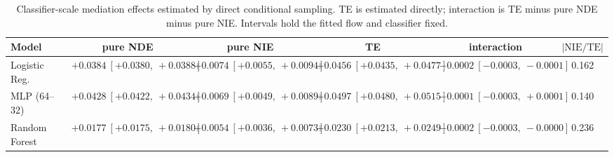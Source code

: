\begin{table}[htbp]
  \centering
  \caption{Classifier-scale mediation effects estimated by direct conditional sampling. TE is estimated directly; interaction is TE minus pure NDE minus pure NIE. Intervals hold the fitted flow and classifier fixed.}
  \label{tab:german_synth_m0_gap_overall}
  \begin{tabular}{lccccc}
    \toprule
    Model & pure NDE & pure NIE & TE & interaction & $|\mathrm{NIE}/\mathrm{TE}|$ \\
    \midrule
    Logistic Reg. & $+0.0384\ [+0.0380,\ +0.0388]$ & $+0.0074\ [+0.0055,\ +0.0094]$ & $+0.0456\ [+0.0435,\ +0.0477]$ & $-0.0002\ [-0.0003,\ -0.0001]$ & 0.162 \\
    MLP (64--32) & $+0.0428\ [+0.0422,\ +0.0434]$ & $+0.0069\ [+0.0049,\ +0.0089]$ & $+0.0497\ [+0.0480,\ +0.0515]$ & $-0.0001\ [-0.0003,\ +0.0001]$ & 0.140 \\
    Random Forest & $+0.0177\ [+0.0175,\ +0.0180]$ & $+0.0054\ [+0.0036,\ +0.0073]$ & $+0.0230\ [+0.0213,\ +0.0249]$ & $-0.0002\ [-0.0003,\ -0.0000]$ & 0.236 \\
    \bottomrule
  \end{tabular}
\end{table}